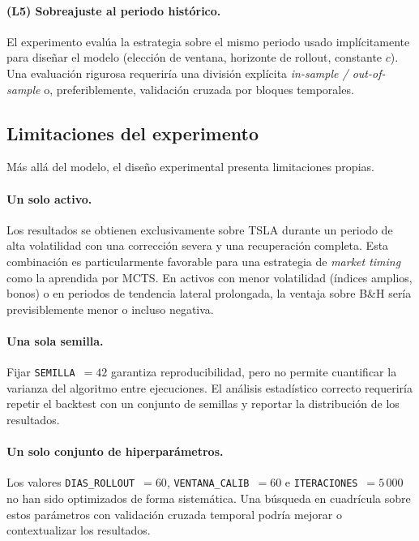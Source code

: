 \paragraph{(L5) Sobreajuste al periodo histórico.} El experimento evalúa la estrategia sobre el mismo periodo usado implícitamente para diseñar el modelo (elección de ventana, horizonte de rollout, constante $c$). Una evaluación rigurosa requeriría una división explícita \emph{in-sample / out-of-sample} o, preferiblemente, validación cruzada por bloques temporales.

\subsection{Limitaciones del experimento}
\label{subsec:limitaciones-experimento}

Más allá del modelo, el diseño experimental presenta limitaciones propias.

\paragraph{Un solo activo.} Los resultados se obtienen exclusivamente sobre TSLA durante un periodo de alta volatilidad con una corrección severa y una recuperación completa. Esta combinación es particularmente favorable para una estrategia de \emph{market timing} como la aprendida por MCTS. En activos con menor volatilidad (índices amplios, bonos) o en periodos de tendencia lateral prolongada, la ventaja sobre B\&H sería previsiblemente menor o incluso negativa.

\paragraph{Una sola semilla.} Fijar \texttt{SEMILLA}~$= 42$ garantiza reproducibilidad, pero no permite cuantificar la varianza del algoritmo entre ejecuciones. El análisis estadístico correcto requeriría repetir el backtest con un conjunto de semillas y reportar la distribución de los resultados.

\paragraph{Un solo conjunto de hiperparámetros.} Los valores \texttt{DIAS\_ROLLOUT}~$= 60$, \texttt{VENTANA\_CALIB}~$= 60$ e \texttt{ITERACIONES}~$= 5\,000$ no han sido optimizados de forma sistemática. Una búsqueda en cuadrícula sobre estos parámetros con validación cruzada temporal podría mejorar o contextualizar los resultados.

